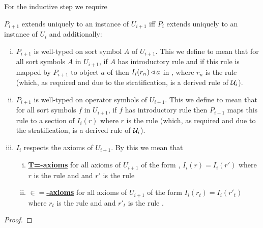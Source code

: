 For the inductive step we require
\begin{lemmastar}
\item $P_{i+1}$ extends uniquely to an instance of $U_{i+1}$ iff  $P_i$ extends uniquely to an instance of $U_{i}$ and additionally:
\begin{enumerate}[(i)]
\item
$P_{i+1}$ is well-typed on sort symbol $A$ of $U_{i+1}$. This we define to mean that
for all sort symbols $A$ in $U_{i+1}$, if $A$ has introductory rule 
\genericAintroductoryrule and if this rule is mapped by $P_{i+1}$
to object $a$ of \catcw then $I_i(r_n) \triangleleft a$ in \catc, where $r_n$ is the rule 
 (which, as required and due to the stratification, is a derived rule of $\mathcal{U}_i$).
\item  $P_{i+1}$ is well-typed on operator symbols  of $U_{i+1}$. This we define to mean that
for all sort symbols $f$ in $U_{i+1}$, if $f$ has introductory rule 
\genericfintroductoryrule then $P_{i+1}$ maps this rule to a section 
of $I_i(r)$ where $r$ is the rule
 (which, as required and due to the stratification, is a derived rule of $\mathcal{U}_i$). 
\item
 $I_i$ respects the axioms of $U_{i+1}$. By this we mean that 
\begin{enumerate}[(i)]
\item \underline{\textbf{T=-axioms}} 
for all axioms of $U_{i+1}$ of the form
 ,
$I_i(r) = I_i(r')$ where $r$ is the rule
 and  
and $r'$ is the rule 
\item \underline{\textbf{$\boldsymbol{\in=}$-axioms}} 
for all axioms of $U_{i+1}$ of the form
$I_i(r_t) = I_i(r'_t)$ where $r_t$ is the rule
 and  
and $r'_t$ is the rule .
\end{enumerate}
\end{enumerate}
\end{lemmastar}
\begin{proof} 
\tbd
\end{proof}

